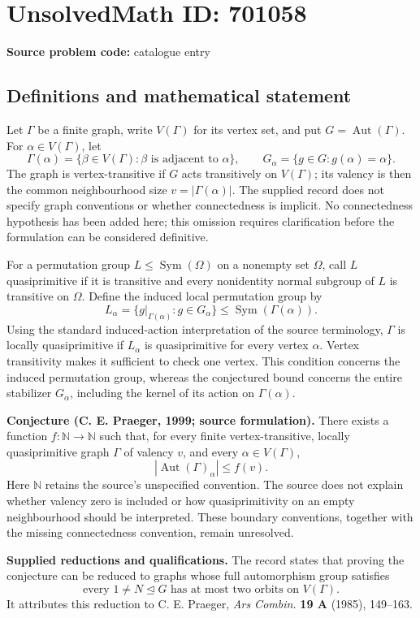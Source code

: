 \documentclass[11pt]{article}
\newcommand{\N}{\mathbb{N}}
\begin{document}
\section*{UnsolvedMath ID: 701058}
\textbf{Source problem code:} catalogue entry
\subsection{Definitions and mathematical statement}
Let \(\Gamma\) be a finite graph, write \(V(\Gamma)\) for its vertex set, and put \(G=\operatorname{Aut}(\Gamma)\). For \(\alpha\in V(\Gamma)\), let
\[
\Gamma(\alpha)=\{\beta\in V(\Gamma):\beta\text{ is adjacent to }\alpha\},\qquad
G_\alpha=\{g\in G:g(\alpha)=\alpha\}.
\]
The graph is vertex-transitive if \(G\) acts transitively on \(V(\Gamma)\); its valency is then the common neighbourhood size \(v=|\Gamma(\alpha)|\). The supplied record does not specify graph conventions or whether connectedness is implicit. No connectedness hypothesis has been added here; this omission requires clarification before the formulation can be considered definitive.

For a permutation group \(L\leq\operatorname{Sym}(\Omega)\) on a nonempty set \(\Omega\), call \(L\) quasiprimitive if it is transitive and every nonidentity normal subgroup of \(L\) is transitive on \(\Omega\). Define the induced local permutation group by
\[
L_\alpha=\{g|_{\Gamma(\alpha)}:g\in G_\alpha\}
\leq\operatorname{Sym}(\Gamma(\alpha)).
\]
Using the standard induced-action interpretation of the source terminology, \(\Gamma\) is locally quasiprimitive if \(L_\alpha\) is quasiprimitive for every vertex \(\alpha\). Vertex transitivity makes it sufficient to check one vertex. This condition concerns the induced permutation group, whereas the conjectured bound concerns the entire stabilizer \(G_\alpha\), including the kernel of its action on \(\Gamma(\alpha)\).

\textbf{Conjecture (C. E. Praeger, 1999; source formulation).} There exists a function \(f:\N\to\N\) such that, for every finite vertex-transitive, locally quasiprimitive graph \(\Gamma\) of valency \(v\), and every \(\alpha\in V(\Gamma)\),
\[
|\operatorname{Aut}(\Gamma)_\alpha|\leq f(v).
\]
Here \(\N\) retains the source's unspecified convention. The source does not explain whether valency zero is included or how quasiprimitivity on an empty neighbourhood should be interpreted. These boundary conventions, together with the missing connectedness convention, remain unresolved.

\textbf{Supplied reductions and qualifications.} The record states that proving the conjecture can be reduced to graphs whose full automorphism group satisfies
\[
\text{every }1\ne N\trianglelefteq G\text{ has at most two orbits on }V(\Gamma).
\]
It attributes this reduction to C. E. Praeger, \emph{Ars Combin.} \textbf{19 A} (1985), 149--163.
\end{document}
